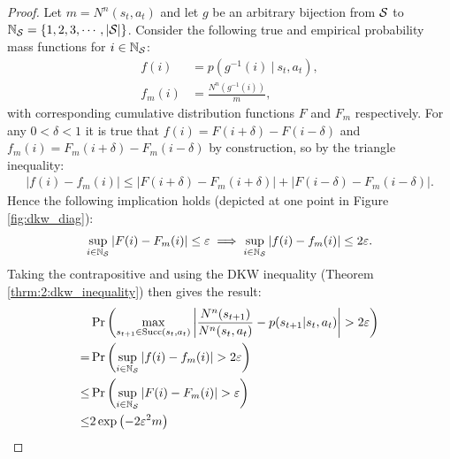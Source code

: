         \begin{proof}
            Let $m=N^n(s_t,a_t)$ and let $g$ be an arbitrary bijection from $\mathcal{S}$ to \mbox{$\mathbb{N}_{\mathcal{S}}=\{1,2,3,\cdots,|\mathcal{S}|\}$}. Consider the following true and empirical probability mass functions for $i\in\mathbb{N}_{\mathcal{S}}$:
            \begin{align}
                f(i) &= p(g^{-1}(i)\ |\ s_t,a_t), \\
                f_m(i) &= \frac{N^n(g^{-1}(i))}{m},
            \end{align}
            with corresponding cumulative distribution functions $F$ and $F_m$ respectively. For any $0<\delta<1$ it is true that $f(i)=F(i+\delta)-F(i-\delta)$ and $f_m(i)=F_m(i+\delta)-F_m(i-\delta)$ by construction, so by the triangle inequality:
            \begin{align}
                \left| f(i)-f_m(i) \right| \leq \left| F(i+\delta) - F_m(i+\delta) \right| + \left| F(i-\delta) - F_m(i-\delta) \right|.
            \end{align}
            Hence the following implication holds (depicted at one point in Figure \ref{fig:dkw_diag}):
            \begin{align}
                \sup_{i\in\mathbb{N}_{\mathcal{S}}} |F(i)-F_m(i)| \leq \varepsilon
                    \implies \sup_{i\in\mathbb{N}_{\mathcal{S}}} |f(i)-f_m(i)| \leq 2\varepsilon.
            \end{align}
            Taking the contrapositive and using the DKW inequality (Theorem \ref{thrm:2:dkw_inequality}) then gives the result:
            \begin{align}
                & \Pr\left(
                    \max_{s_{t+1}\in\text{Succ}(s_t,a_t)}
                        \left| \frac{N^n(s_{t+1})}{N^n(s_t,a_t)} - p(s_{t+1}|s_t,a_t) \right| 
                            > 2 \varepsilon \right) \\
                    = & \Pr\left( \sup_{i\in\mathbb{N}_{\mathcal{S}}} |f(i)-f_m(i)| > 2\varepsilon \right) \\
                    \leq & \Pr\left( \sup_{i\in\mathbb{N}_{\mathcal{S}}} |F(i)-F_m(i)| > \varepsilon \right) \\
                    \leq & 2\exp\left(-2\varepsilon^2m\right)
            \end{align}
        \end{proof}
















